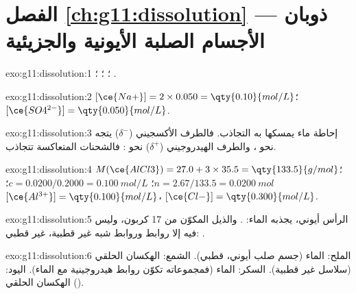 \section*{الفصل \ref{ch:g11:dissolution} --- ذوبان الأجسام الصلبة الأيونية والجزيئية}

\begin{solution}{exo:g11:dissolution:1}
؛
؛
؛
.
\end{solution}

\begin{solution}{exo:g11:dissolution:2}
$[\ce{Na+}] = 2 \times 0.050 = \qty{0.10}{mol/L}$؛
$[\ce{SO4^{2-}}] = \qty{0.050}{mol/L}$.
\end{solution}

\begin{solution}{exo:g11:dissolution:3}
 إحاطة   ماء يمسكها به التجاذب.
فالطرف الأكسجيني ($\delta^-$) يتجه نحو ، والطرف الهيدروجيني
($\delta^+$) نحو : فالشحنات المتعاكسة تتجاذب.
\end{solution}

\begin{solution}{exo:g11:dissolution:4}
$M(\ce{AlCl3}) = 27.0 + 3 \times 35.5 = \qty{133.5}{g/mol}$؛
$n = 2.67 / 133.5 = \qty{0.0200}{mol}$؛ $c = 0.0200 / 0.2000 =
\qty{0.100}{mol/L}$؛ $[\ce{Al^{3+}}] = \qty{0.100}{mol/L}$،
$[\ce{Cl-}] = \qty{0.300}{mol/L}$.
\end{solution}

\begin{solution}{exo:g11:dissolution:5}
الرأس  أيوني، يجذبه الماء: . والذيل
المكوّن من 17  كربون، وليس فيه إلا روابط  وروابط  شبه غير
قطبية، غير قطبي: .
\end{solution}

\begin{solution}{exo:g11:dissolution:6}
الملح: الماء (جسم صلب أيوني،  قطبي). الشمع: الهكسان الحلقي (سلاسل غير
قطبية). السكر: الماء (فمجموعاته  تكوّن روابط هيدروجينية مع
الماء). اليود: الهكسان الحلقي ().
\end{solution}

